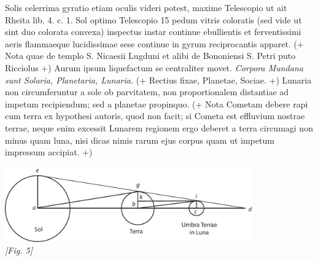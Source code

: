 \pstart 
[92 r\textsuperscript{o}]  Solis celerrima gyratio  etiam oculis videri potest, maxime Telescopio\protect{}  ut ait Rheita\protect{} lib. 4. c. 1. Sol optimo Telescopio\protect{} 15 pedum vitris coloratis (sed vide ut  sint duo colorata convexa\protect{}) inspectus instar  continue ebullientis et ferventissimi aeris  flammaeque lucidissimae sese continue in gyrum reciprocantis apparet. (+ Nota quae  de templo S. Nicaesii Lugduni\protect{} et alibi de Bononiensi S. Petri puto Ricciolus\protect{} +) Aurum\protect{} ipsum liquefactum se centraliter movet.\pend \pstart {} \textit{Corpora Mundana  sunt Solaria, Planetaria, Lunaria.}  (+ Rectius fixae\protect{}, Planetae\protect{}, Sociae. +) Lunaria non circumferuntur a sole\protect{}  ob parvitatem, non proportionalem  distantiae ad impetum recipiendum; sed  a planetae\protect{} propinquo. (+ Nota Cometam\protect{} debere rapi cum terra\protect{} ex  hypothesi autoris, quod non facit; si Cometa\protect{} est effluvium nostrae terrae\protect{}, neque  enim excessit Lunarem regionem  ergo deberet a terra\protect{} circumagi non  minus quam luna\protect{}, nisi dicas nimis  rarum  ejus corpus  quam ut impetum impressum\protect{} accipiat. +)\pend
   \begin{center}
   \includegraphics[width=0.8\textwidth]{images/LH35_14_2_92r1}
   \\\textit{[Fig. 5]} \\%
    \end{center}
